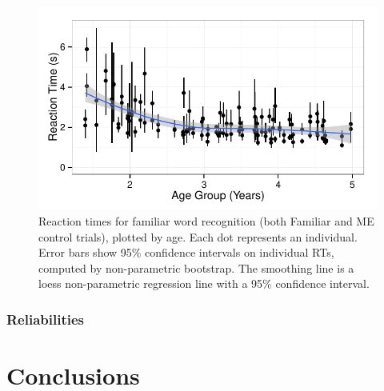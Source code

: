 \documentclass[man,noapacite]{apa2}
\begin{document}
\begin{figure}[t] 
  \begin{center} 
    \includegraphics[width=5in]{figures/individuals.pdf} 
    \caption{\label{fig:rt} Reaction times for familiar word recognition (both Familiar and ME control trials), plotted by age. Each dot represents an individual. Error bars show 95\% confidence intervals on individual RTs, computed by non-parametric bootstrap. The smoothing line is a loess non-parametric regression line with a 95\% confidence interval.}
  \end{center} 
\end{figure}


\subsubsection{Reliabilities}

\section{Conclusions} 




\end{document}
